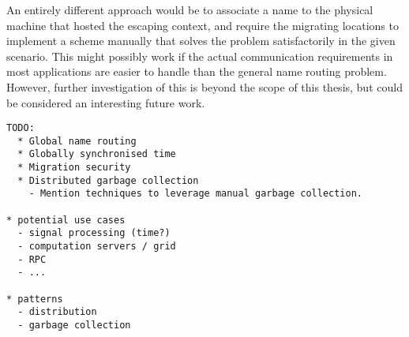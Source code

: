 \vspace{1em}

An entirely different approach would be to associate a name to the physical
machine that hosted the escaping context, and require the migrating locations to
implement a scheme manually that solves the problem satisfactorily in the given
scenario. This might possibly work if the actual communication requirements in
most applications are easier to handle than the general name routing problem.
However, further investigation of this is beyond the scope of this thesis, but
could be considered an interesting future work.


\begin{verbatim}
TODO:
  * Global name routing
  * Globally synchronised time
  * Migration security
  * Distributed garbage collection
    - Mention techniques to leverage manual garbage collection.

* potential use cases
  - signal processing (time?)
  - computation servers / grid
  - RPC
  - ...

* patterns
  - distribution
  - garbage collection
\end{verbatim}
